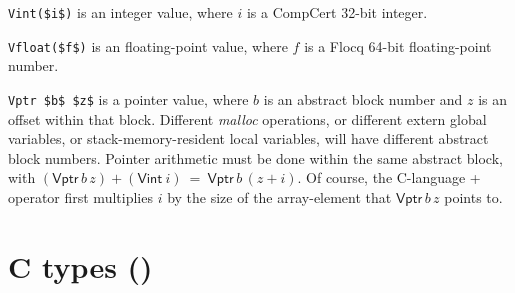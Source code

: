 \documentclass[12pt,fleqn,openany,oneside,showtrims]{memoir}
\newcommand{\ychapter}[2]{\chapter[#1]{#1 \hfill \normalsize #2}}
\begin{document}
\lstinline{Vint($i$)} is an integer value,
where $i$ is a CompCert 32-bit integer.

\lstinline{Vfloat($f$)} is an floating-point value,
where $f$ is a Flocq 64-bit floating-point number.

\lstinline{Vptr $b$ $z$} is a pointer value,
where $b$ is an abstract block number and $z$ is an offset
within that block.  Different \emph{malloc} operations,
or different extern global variables, or 
stack-memory-resident local variables,
will have different abstract block numbers.
Pointer arithmetic must be done within the same abstract block,
with $(\mathsf{Vptr}\,b\,z)+(\mathsf{Vint}~i)~=~\mathsf{Vptr}\,b\,(z+i)$.
Of course, the C-language + operator first multiplies $i$
by the size of the array-element that 
$\mathsf{Vptr}\,b\,z$ points to.

\ychapter{C types}{()}
\end{document}
